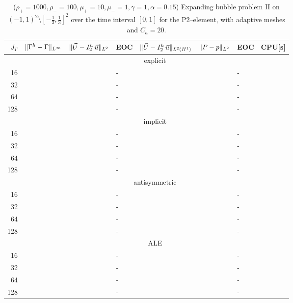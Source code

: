 \begin{table}
\center
\hspace*{-3.25cm}
\begin{tabular}{rllllllr}
\hline
$J_\Gamma$ & $\|\Gamma^h - \Gamma\|_{L^\infty}$ & $\|\vec U - I^h_{2}\,\vec u\|_{L^2}$ & EOC & $\|\vec U - I^h_{2}\,\vec u\|_{L^2(H^1)}$ & $\|P - p\|_{L^2}$ & EOC
& CPU[s] \\
\hline
& \multicolumn{7}{c}{explicit} \\
\hline
 16 & & & - & & & - & \\
 32 & & & - & & & - & \\
 64 & & & - & & & - & \\
128 & & & - & & & - & \\
\hline
& \multicolumn{7}{c}{implicit} \\
\hline
 16 & & & - & & & - & \\
 32 & & & - & & & - & \\
 64 & & & - & & & - & \\
128 & & & - & & & - & \\
\hline
& \multicolumn{7}{c}{antisymmetric} \\
\hline
 16 & & & - & & & - & \\
 32 & & & - & & & - & \\
 64 & & & - & & & - & \\
128 & & & - & & & - & \\
\hline
& \multicolumn{7}{c}{ALE} \\
\hline
 16 & & & - & & & - & \\
 32 & & & - & & & - & \\
 64 & & & - & & & - & \\
128 & & & - & & & - & \\
\hline
\end{tabular}
\hspace*{-3.25cm}
\caption[Navier--Stokes expanding bubble II errors P2--\pdg]
{($\rho_+ = 1000,\rho_- = 100,\mu_+ = 10,\mu_- =1,\gamma = 1,\alpha=0.15$)
Expanding bubble problem II on $(-1,1)^2\setminus[-\frac{1}{3},\frac{1}{3}]^2$
over the time interval $[0,1]$ for the P2--\pdg element, with adaptive
meshes and $C_a=20$\textdegree.}
\label{tab:nsexpandingbubbleIIp2p1dg}
\end{table}

